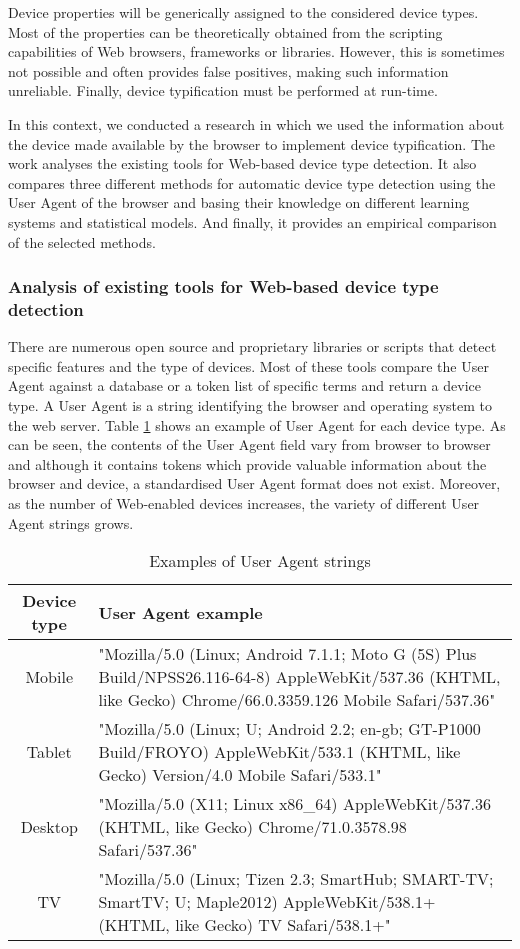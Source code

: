 Device properties will be generically assigned to the considered device types. 
Most of the properties can be theoretically obtained from the scripting capabilities of Web browsers, frameworks or libraries. 
However, this is sometimes not possible and often provides false positives, making such information unreliable. 
Finally, device typification must be performed at run-time. 

In this context, we conducted a research in which we used the information about the device made available by the browser to implement device typification. 
The work \cite{dominguez2019methods} analyses the existing tools for Web-based device type detection. It also compares three different methods for automatic device type detection using the User Agent of the browser and basing their knowledge on different learning systems and statistical models. And finally, it provides an empirical comparison of the selected methods.

\subsubsection{Analysis of existing tools for Web-based device type detection}\label{soa}

There are numerous open source and proprietary libraries or scripts that detect specific features and the type of devices. Most of these tools compare the User Agent against a database or a token list of specific terms and return a device type. A User Agent is a string identifying the browser and operating system to the web server. Table \ref{tab:uaex} shows an example of User Agent for each device type. As can be seen, the contents of the User Agent field vary from browser to browser and although it contains tokens which provide valuable information about the browser and device, a standardised User Agent format does not exist. Moreover, as the number of Web-enabled devices increases, the variety of different User Agent strings grows.

\begin{table}
	\centering
	\caption{Examples of User Agent strings}
	\label{tab:uaex}
	\begin{tabular}{||c|p{10cm}||}
		\hline
		\textbf{Device type}&\textbf{User Agent example} \\
		\hline
		Mobile & "Mozilla/5.0 (Linux; Android 7.1.1; Moto G (5S) Plus Build/NPSS26.116-64-8) AppleWebKit/537.36 (KHTML, like Gecko) Chrome/66.0.3359.126 Mobile Safari/537.36"
		\\
		\hline
		Tablet & "Mozilla/5.0 (Linux; U; Android 2.2; en-gb; GT-P1000 Build/FROYO) AppleWebKit/533.1 (KHTML, like Gecko) Version/4.0 Mobile Safari/533.1"\\
		\hline
		Desktop & "Mozilla/5.0 (X11; Linux x86\_64) AppleWebKit/537.36 (KHTML, like Gecko) Chrome/71.0.3578.98 Safari/537.36"\\
		\hline
		TV & "Mozilla/5.0 (Linux; Tizen 2.3; SmartHub; SMART-TV; SmartTV; U; Maple2012) AppleWebKit/538.1+ (KHTML, like Gecko) TV Safari/538.1+" \\
		\hline		
	\end{tabular}
\end{table}

